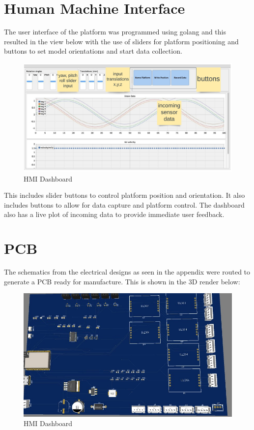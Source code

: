 \section{Human Machine Interface}
The user interface of the platform was programmed using golang and this resulted in the view below with the use of sliders for platform positioning and buttons to set model orientations and start data collection.
\begin{center}
	\begin{figure}[!h]
	\centering
	\includegraphics[width=0.7\linewidth]{Figures/hmi}
	\caption[HMI Dashboard]{HMI Dashboard}
	\end{figure}
\end{center}

This includes slider buttons to control platform position and orientation. It also includes buttons to allow for data capture  and platform control. The dashboard also has a live plot of incoming data to provide immediate user feedback.

\section{PCB}
The schematics from the electrical designs as seen in the appendix were routed to generate a PCB ready for manufacture. This is shown in the 3D render below:
\begin{center}
	\begin{figure}[!h]
	\centering
	\includegraphics[width=0.7\linewidth]{Figures/pcb}
	\caption[HMI Dashboard]{HMI Dashboard}
	\end{figure}
\end{center}
